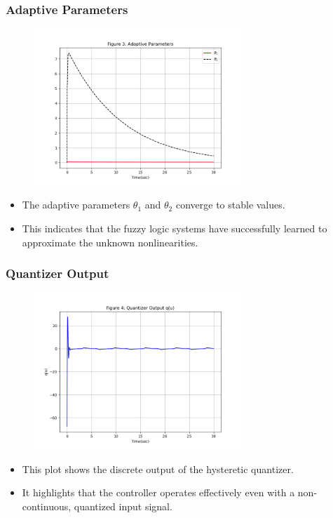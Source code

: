 \documentclass[18p]{beamer}
\begin{document}
\begin{frame}
	\frametitle{Adaptive Parameters}
	\vspace*{1\baselineskip}
	\begin{figure}[h!]
		\centering
		\includegraphics[width=0.70\textwidth]{./img/sim3.png}
	\end{figure}
	\begin{itemize}
		\item The adaptive parameters $\theta_1$ and $\theta_2$ converge to stable values.
\item This indicates that the fuzzy logic systems have successfully learned to approximate the unknown nonlinearities.
	\end{itemize}
\end{frame}
\begin{frame}
	\frametitle{Quantizer Output}
	\vspace*{1\baselineskip}
	\begin{figure}[h!]
		\centering
		\includegraphics[width=0.70\textwidth]{./img/sim4.png}
	\end{figure}
	\begin{itemize}
		\item This plot shows the discrete output of the hysteretic quantizer.
		\item It highlights that the controller operates effectively even with a non-continuous, quantized input signal.
	\end{itemize}
\end{frame}
\end{document}
